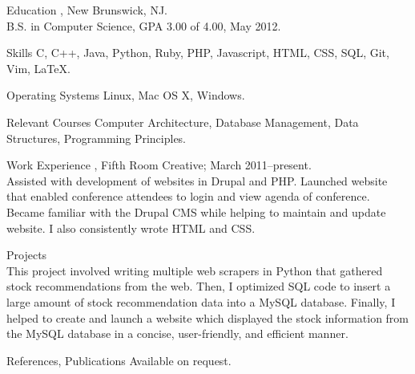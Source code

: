 \documentclass{resume}
\author{~~~~~~Michael J. Wilcox}
\begin{document}
\maketitle


\begin{category}{Education}
, New Brunswick, NJ.\\
B.S. in Computer Science,  GPA 3.00 of 4.00, May 2012.
\end{category}

\begin{category}{Skills}
\citemnobullet 
C, C++, Java, Python, Ruby, PHP, Javascript, HTML, CSS, SQL, Git, Vim, \LaTeX.
\end{category}

\begin{category}{Operating Systems}
\citemnobullet
Linux, Mac OS X, Windows.\\
\end{category}

\begin{category}{Relevant Courses}
\citemnobullet
Computer Architecture, Database Management, Data Structures, Programming Principles.
\end{category}

\begin{category}{Work Experience}
, Fifth Room Creative;
March 2011--present.\\
Assisted with development of websites in Drupal and PHP. Launched website that enabled conference attendees to login and view agenda of conference. Became familiar with the Drupal CMS while helping to maintain and update website. I also consistently wrote HTML and CSS. %
\end{category}

\begin{category}{Projects}
\\
This project involved writing multiple web scrapers in Python that gathered stock recommendations from the web. Then, I optimized SQL code to insert a large amount of stock recommendation data into a MySQL database. Finally, I helped to create and launch a website which displayed the stock information from the MySQL database in a concise, user-friendly, and efficient manner.
\end{category}


\begin{category}{References, Publications} 
\citemnobullet Available on request.
\end{category}
\end{document}
